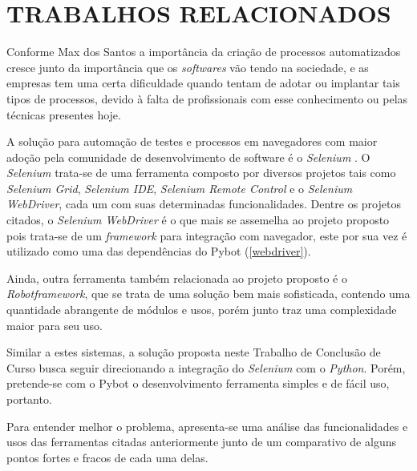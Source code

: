 %
%

\chapter{TRABALHOS RELACIONADOS}\label{chap:relacionados}

    Conforme Max dos Santos \cite{dos2016estudo} a importância da criação de processos automatizados cresce junto da importância que os \textit{softwares}
    vão tendo na sociedade, e as empresas tem uma certa dificuldade quando tentam de adotar ou implantar tais tipos de processos, devido à falta de
    profissionais com esse conhecimento ou pelas técnicas presentes hoje.

    A solução para automação de testes e processos em navegadores com maior adoção pela comunidade de desenvolvimento de software é o \textit{Selenium}
    \cite{selenium}. O \textit{Selenium} trata-se de uma ferramenta composto por diversos projetos tais como \textit{Selenium Grid}, \textit{Selenium IDE},
    \textit{Selenium Remote Control} e o \textit{Selenium WebDriver}, cada um com suas determinadas funcionalidades. Dentre os projetos citados, o
    \textit{Selenium WebDriver} é o que mais se assemelha ao projeto proposto pois trata-se de um \textit{framework} para integração com navegador,
    este por sua vez é utilizado como uma das dependências do Pybot (\autoref{webdriver}).

    Ainda, outra ferramenta também relacionada ao projeto proposto é o \textit{Robotframework}, que se trata de uma solução bem mais sofisticada,
    contendo uma quantidade abrangente de módulos e usos, porém junto traz uma complexidade maior para seu uso.

    Similar a estes sistemas, a solução proposta neste Trabalho de Conclusão de Curso busca seguir direcionando a integração do \textit{Selenium} com
    o \textit{Python}. Porém, pretende-se com o Pybot o desenvolvimento ferramenta simples e de fácil uso, portanto.

    Para entender melhor o problema, apresenta-se uma análise das funcionalidades e usos das ferramentas citadas anteriormente junto de um comparativo
    de alguns pontos fortes e fracos de cada uma delas.

